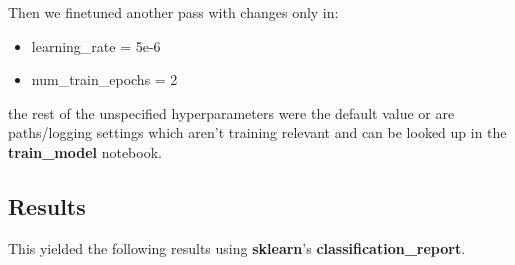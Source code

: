\documentclass[11pt,a4paper]{article}
\begin{document}
Then we finetuned another pass with changes only in:

\begin{itemize}
    \setlength{\itemsep}{0.5pt}
    \item learning\_rate = 5e-6
    \item num\_train\_epochs = 2
\end{itemize}
the rest of the unspecified hyperparameters were the default value or are paths/logging settings which aren't training
relevant and can be looked up in the \textbf{train\_model} notebook.

\subsection{Results}
This yielded the following results using \textbf{sklearn}'s \textbf{classification\_report}.
\begin{table}
\caption{Classification report for our finetuned model without external features}


\label{tab:model}
\end{table}
\end{document}
